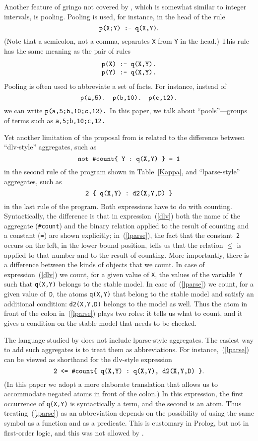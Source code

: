 \documentclass{tlp}
\def\beq{\begin{equation}}
\def\eeq#1{\label{#1}\end{equation}}
\def\ba{\begin{array}}
\def\ea{\end{array}}
\begin{document}
Another feature of {\sc gringo} not covered by 
\citeyear{har14a}, which is somewhat
similar to integer intervals, is pooling.  Pooling is used, for instance, in
the head of the rule
$$\hbox{\tt p(X;Y) :- q(X,Y)}.$$
(Note that a semicolon, not a comma, separates {\tt X} from {\tt Y} in
the head.) This rule has the same meaning as the pair of rules
$$\ba c
\hbox{\tt p(X) :- q(X,Y).}\\
\hbox{\tt p(Y) :- q(X,Y).}
\ea
$$
Pooling is often used to abbreviate a set of facts.  For instance, instead of
$$\hbox{\tt p(a,5).}\quad\hbox{\tt p(b,10).}\quad\hbox{\tt p(c,12).}$$
we can write
$\hbox{\tt p(a,5;b,10;c,12).}$
In this paper, we talk about ``pools''---groups of terms such as
\hbox{\tt a,5;b,10;c,12.}

Yet another limitation of the proposal from  \citeyear{har14a} is related to the difference between
``dlv-style'' aggregates, such as
\beq
\hbox{\tt not \#count\{ Y : q(X,Y) \} = 1}
\eeq{dlv}
in the second rule of the program shown in Table~\ref{Kappa}, and
``lparse-style'' aggregates, such as
\beq
\hbox{\tt 2 \{ q(X,Y) : d2(X,Y,D) \}}
\eeq{lparse}
in the last rule of the program.  Both expressions have to do with counting.
Syntactically, the difference is that in expression~(\ref{dlv}) both the name
of the aggregate ({\tt \#count}) and the binary relation applied to the result
of counting and a constant ({\tt =}) are shown explicitly; in~(\ref{lparse}),
the fact that the constant~{\tt 2}
occurs on the left, in the lower bound position, tells us that the
relation $\leq$ is applied to that number and to the result of counting.
More importantly, there is a difference between the kinds of objects that we
count.  In case of expression~(\ref{dlv}) we count, for a given value of
{\tt X},  the values of the variable~{\tt Y} such that {\tt q(X,Y)}
belongs to the stable model.  In case of~(\ref{lparse}) we count, for a given
value of~{\tt D},  the atoms {\tt q(X,Y)} that belong to the stable model
and satisfy an additional condition: {\tt d2(X,Y,D)} belongs to the model
as well.  Thus the atom in front of the colon in~(\ref{lparse}) plays two
roles: it tells us what to count, and it gives a condition on the stable
model that needs to be checked.

The language studied by  \citeyear{har14a} does not include
lparse-style
aggregates.  The easiest way to add such aggregates is to treat them as
abbreviations.  For instance,~(\ref{lparse}) can be viewed as shorthand for
the dlv-style expression
$$\hbox{\tt 2 <= \#count\{ q(X,Y) : q(X,Y), d2(X,Y,D) \}}.$$
(In this paper we adopt a more elaborate translation that allows us to
accommodate negated atoms in front of the colon.)  In this expression, the
first occurrence of {\tt q(X,Y)} is syntactically a term, and the second is
an atom.  Thus treating~(\ref{lparse}) as an abbreviation depends on the
possibility of using the same symbol as a function and as a predicate.  This is
customary in Prolog, but not in first-order logic, and this was not allowed by
 \citeyear{har14a}.
\end{document}
